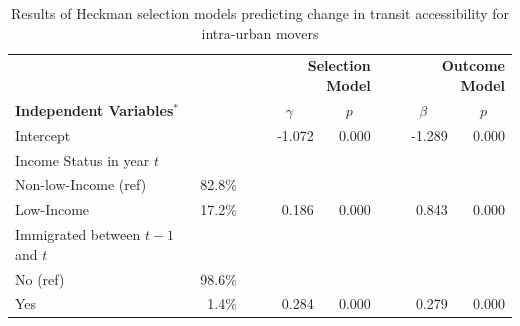 \begin{table}[H]
	
	\renewcommand{\baselinestretch}{1.0} 
	\small
	
	\caption{{Results of Heckman selection models predicting change in transit accessibility for intra-urban movers}}
	\label{table:models}
	
	\begin{adjustwidth}{-1in}{-1in}
		\centering
	\begin{tabular}{lrrrrrrr}
		\hline
		&         &  & \multicolumn{2}{r}{\textbf{Selection Model}}              &                      & \multicolumn{2}{r}{\textbf{Outcome Model}}                \\
		\textbf{Independent Variables$^*$}   &  &  & \multicolumn{1}{c}{$\gamma$} & \multicolumn{1}{c}{$p$} & \multicolumn{1}{c}{} & \multicolumn{1}{c}{$\beta$} & \multicolumn{1}{c}{$p$} \\ \hline
		Intercept                               &         &  & -1.072                   & 0.000                 &                      & -1.289                   & 0.000                 \\
		Income Status in year $t$                   &         &  &                          &                       &                      &                          &                       \\
		\hspace{2mm} Non-low-Income (ref)                         & 82.8\%  &  &                          &                       &                      &                          &                       \\
		\hspace{2mm} Low-Income                                & 17.2\%  &  & 0.186                    & 0.000                 &                      & 0.843                    & 0.000                 \\
		Immigrated between $t - 1$ and $t$             &         &  &                          &                       &                      &                          &                       \\
		\hspace{2mm} No (ref)                                  & 98.6\%  &  &                          &                       &                      &                          &                       \\
		\hspace{2mm} Yes                                       & 1.4\%   &  & 0.284                    & 0.000                 &                      & 0.279                    & 0.000                 \\

\end{tabular}
\end{adjustwidth}
\end{table}
